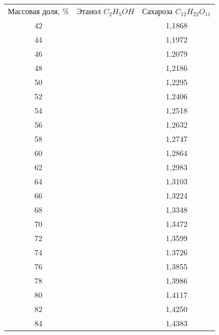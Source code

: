 \begin{tabular}{ccc}
Массовая доля, \% 
& Этанол $C_2H_5OH$
& Сахароза $C_{12}H_{22}O_{11}$ \\
42	& & 1,1868 \\
44	& & 1,1972 \\
46	& & 1,2079 \\
48	& & 1,2186 \\
50	& & 1,2295 \\
52	& & 1,2406 \\
54	& & 1,2518 \\
56	& & 1,2632 \\
58	& & 1,2747 \\
60	& & 1,2864 \\
62	& & 1,2983 \\
64	& & 1,3103 \\
66	& & 1,3224 \\
68	& & 1,3348 \\
70	& & 1,3472 \\
72	& & 1,3599 \\
74	& & 1,3726 \\
76	& & 1,3855 \\
78	& & 1,3986 \\
80	& & 1,4117 \\
82	& & 1,4250 \\
84	& & 1,4383
\end{tabular}

